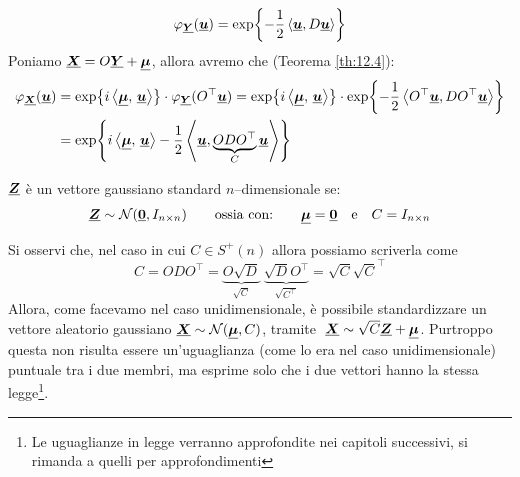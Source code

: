 \begin{proposizione}
\begin{dimostrazione}
        \[\varphi_{\ve{Y}}(\ve{u}) = \ex{-\frac{1}{2}\left\langle\ve{u}, D\ve{u}\right\rangle}\]
        Poniamo $\ve{X}= O\ve{Y} + \ve{\mu}$, allora avremo che (Teorema \ref{th:12.4}):
        \begin{align*}
            \varphi_{\ve{X}}(\ve{u}) & = \ex{i\scalar{\mu}{u}} \cdot \varphi_{\ve{Y}}(O^\top \ve{u}) = \ex{i\scalar{\mu}{u}} \cdot \ex{-\frac{1}{2}\left\langle O^\top \ve{u}, DO^\top \ve{u}\right\rangle} \\
            & = \ex{i\scalar{\mu}{u} - \frac{1}{2}\left\langle \ve{u}, \underbrace{ODO^\top}_C \ve{u}\right\rangle}
        \end{align*}
    \end{dimostrazione}
\end{proposizione}

\begin{definizione}
    $\ve{Z}$ è un vettore gaussiano standard $n$--dimensionale se:
    \[\ve{Z}\sim\mathcal{N}(\ve{0}, I_{n\times n})\qquad \text{ossia con:}\qquad \ve{\mu} = \ve{0}\quad \text{e}\quad C = I_{n\times n}\]
\end{definizione}

\noindent Si osservi che, nel caso in cui $C\in S^+(n)$ allora possiamo scriverla come 
\[
    C = ODO^\top = \underbrace{O \sqrt{D}}_{\sqrt{C}} \;\underbrace{\sqrt{D}O^\top}_{\sqrt{C^\top}} = \sqrt{C}\sqrt{C}^\top
\]
Allora, come facevamo nel caso unidimensionale, è possibile standardizzare un vettore aleatorio gaussiano $\ve{X}\sim \mathcal{N}(\ve{\mu}, C)$, tramite \(\;\ve{X}\sim \sqrt{C} \ve{Z} + \ve{\mu}\). Purtroppo questa non risulta essere un'uguaglianza (come lo era nel caso unidimensionale) puntuale tra i due membri, ma esprime solo che i due vettori hanno la stessa legge\footnote{Le uguaglianze in legge verranno approfondite nei capitoli successivi, si rimanda a quelli per approfondimenti}.

